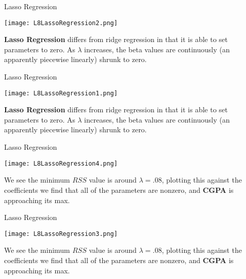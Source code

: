 \documentclass[10pt, table, dvipsnames,xcdraw,handout]{beamer}
\begin{document}
\begin{frame}[fragile]{Lasso Regression} 
  \begin{minipage}[t][0.7\textheight][t]{\textwidth}
	\centering \texttt{[image: L8LassoRegression2.png]} 
  \end{minipage}
  \vfill
\begin{minipage}[t][0.3\textheight][t]{\textwidth}
\textbf{Lasso Regression} differs from ridge regression in that it is able to set parameters to zero. As $\lambda$ increases, the beta values are continuously (an apparently piecewise linearly) shrunk to zero. 
\end{minipage}
\end{frame}



\begin{frame}[fragile]{Lasso Regression} 
  \begin{minipage}[t][0.7\textheight][t]{\textwidth}
	\centering \texttt{[image: L8LassoRegression1.png]} 
  \end{minipage}
  \vfill
\begin{minipage}[t][0.3\textheight][t]{\textwidth}
\textbf{Lasso Regression} differs from ridge regression in that it is able to set parameters to zero. As $\lambda$ increases, the beta values are continuously (an apparently piecewise linearly) shrunk to zero. 
\end{minipage}
\end{frame}



\begin{frame}[fragile]{Lasso Regression} 
  \begin{minipage}[t][0.7\textheight][t]{\textwidth}
	\centering \texttt{[image: L8LassoRegression4.png]} 
  \end{minipage}
  \vfill
\begin{minipage}[t][0.3\textheight][t]{\textwidth}
We see the minimum $RSS$ value is around $\lambda = .08$, plotting this against the coefficients we find that all of the parameters are nonzero, and \textbf{CGPA} is approaching its max. 
\end{minipage}
\end{frame}


\begin{frame}[fragile]{Lasso Regression} 
  \begin{minipage}[t][0.7\textheight][t]{\textwidth}
	\centering \texttt{[image: L8LassoRegression3.png]} 
  \end{minipage}
  \vfill
\begin{minipage}[t][0.3\textheight][t]{\textwidth}
We see the minimum $RSS$ value is around $\lambda = .08$, plotting this against the coefficients we find that all of the parameters are nonzero, and \textbf{CGPA} is approaching its max.
\end{minipage}
\end{frame}
\end{document}
